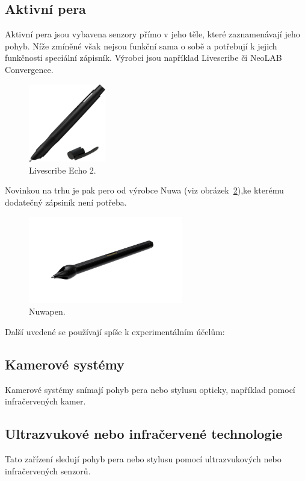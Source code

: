 \subsection*{Aktivní pera}
Aktivní pera jsou vybavena senzory přímo v jeho těle, které zaznamenávají jeho pohyb.
Níže zmíněné však nejsou funkční sama o sobě a potřebují k jejich funkčnosti speciální zápisník. 
Výrobci jsou například Livescribe či NeoLAB Convergence.

\begin{figure}[H]
  \centering
  \includegraphics[width=0.3\textwidth]{obrazky-figures/Livescribe.png}
  \caption{Livescribe Echo 2.~\cite{livescribe_echo2}} 
  \label{fig:Livescribe}
\end{figure}
\newpage
\noindent
Novinkou na trhu je pak pero od výrobce Nuwa (viz obrázek~\ref{fig:Nuwapen}),ke kterému dodatečný zápsiník není potřeba.

\begin{figure}[H]
  \centering
  \includegraphics[width=0.6\textwidth]{obrazky-figures/Nuwapen.png}
  \caption{Nuwapen.~\cite{nuwapen}} 
  \label{fig:Nuwapen}
\end{figure}


\noindent
Další uvedené se používají spíše k experimentálním účelům:

\subsection*{Kamerové systémy}
Kamerové systémy snímají pohyb pera nebo stylusu opticky, například pomocí infračervených kamer. 

\subsection*{Ultrazvukové nebo infračervené technologie}
Tato zařízení sledují pohyb pera nebo stylusu pomocí ultrazvukových nebo infračervených senzorů. 

